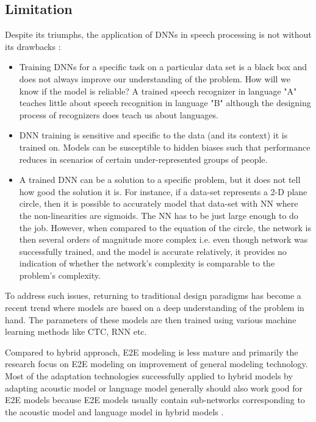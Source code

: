\subsection{Limitation}
\label{sub:e2e-limitation}

Despite its triumphs, the application of DNNs in speech processing is not without its drawbacks \cite{backstrom_introduction_2022}:

\begin{itemize}
    \item Training DNNs for a specific task on a particular data set is a black box and does not always improve our understanding of the problem. How will we know if the model is reliable? A trained speech recognizer in language "A" teaches little about speech recognition in language "B" although the designing process of recognizers does teach us about languages.
    \item DNN training is sensitive and specific to the data (and its context) it is trained on. Models can be susceptible to hidden biases such that performance reduces in scenarios of certain under-represented groups of people.
    \item A trained DNN can be a solution to a specific problem, but it does not tell how good the solution it is. For instance, if a data-set represents a 2-D plane circle, then it is possible to accurately model that data-set with NN where the non-linearities are sigmoids. The NN has to be  just large enough to do the job. However, when compared to the equation of the circle, the network is then several orders of magnitude more complex i.e. even though network was successfully trained, and the model is accurate relatively, it provides no indication of whether the network's complexity is comparable to the problem's complexity. 
\end{itemize}

To address such issues, returning to traditional design paradigms has become a recent trend where models are based on a deep understanding of the problem in hand. The parameters of these models are then trained using various  machine learning methods like CTC, RNN etc.

Compared to hybrid approach, E2E modeling is less mature and primarily the research focus on E2E modeling on improvement of general modeling technology. Most of the adaptation technologies successfully applied to hybrid models by adapting acoustic model or language model generally should also work good for E2E models because E2E models usually contain sub-networks corresponding to the acoustic model and language model in hybrid models \cite{bell_adaptation_2020}.

